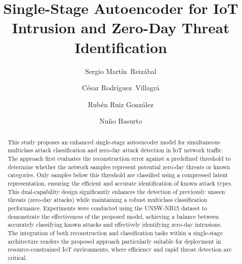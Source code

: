 \documentclass[runningheads]{llncs}
\begin{document}
\title{Single-Stage Autoencoder for IoT Intrusion and Zero-Day Threat Identification}

\author{Sergio Mart\'in~Reiz\'abal
\and C\'{e}sar {Rodr\'{i}guez~Villagr\'{a}}\and Rub\'{e}n Ruiz Gonz\'{a}lez \and Nu{\~n}o Basurto }
\maketitle

\begin{abstract}
This study proposes an enhanced single-stage autoencoder model for simultaneous multiclass attack classification and zero-day attack detection in IoT network traffic. The approach first evaluates the reconstruction error against a predefined threshold to determine whether the network samples represent potential zero-day threats or known categories. Only samples below this threshold are classified using a compressed latent representation, ensuring the efficient and accurate identification of known attack types. This dual-capability design significantly enhances the detection of previously unseen threats (zero-day attacks) while maintaining a robust multiclass classification performance. Experiments were conducted using the UNSW-NB15 dataset to demonstrate the effectiveness of the proposed model, achieving a balance between accurately classifying known attacks and effectively identifying zero-day intrusions. The integration of both reconstruction and classification tasks within a single-stage architecture renders the proposed approach particularly suitable for deployment in resource-constrained IoT environments, where efficiency and rapid threat detection are critical.
\end{abstract}
\end{document}
